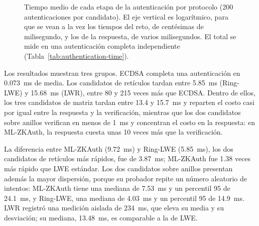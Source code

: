 \begin{figure}[H]
\centering
{}
\caption{Tiempo medio de cada etapa de la autenticación por protocolo (200 autenticaciones por candidato). El eje vertical es logarítmico, para que se vean a la vez los tiempos del reto, de centésimas de milisegundo, y los de la respuesta, de varios milisegundos. El total se mide en una autenticación completa independiente (Tabla~\ref{tab:authentication-time}).}
\label{fig:auth-stage-comparison}
\end{figure}

Los resultados muestran tres grupos. ECDSA completa una autenticación en 0.073~ms de media. Los candidatos de retículos tardan entre 5.85~ms (Ring-LWE) y 15.68~ms (LWR), entre 80 y 215 veces más que ECDSA. Dentro de ellos, los tres candidatos de matriz tardan entre 13.4 y 15.7~ms y reparten el costo casi por igual entre la respuesta y la verificación, mientras que los dos candidatos sobre anillos verifican en menos de 1~ms y concentran el costo en la respuesta: en ML-ZKAuth, la respuesta cuesta unas 10 veces más que la verificación.

La diferencia entre ML-ZKAuth (9.72~ms) y Ring-LWE (5.85~ms), los dos candidatos de retículos más rápidos, fue de 3.87~ms; ML-ZKAuth fue 1.38 veces más rápido que LWE estándar. Los dos candidatos sobre anillos presentan además la mayor dispersión, porque su probador repite un número aleatorio de intentos: ML-ZKAuth tiene una mediana de 7.53~ms y un percentil 95 de 24.1~ms, y Ring-LWE, una mediana de 4.03~ms y un percentil 95 de 14.9~ms. LWR registró una medición aislada de 234~ms, que eleva su media y su desviación; su mediana, 13.48~ms, es comparable a la de LWE.

